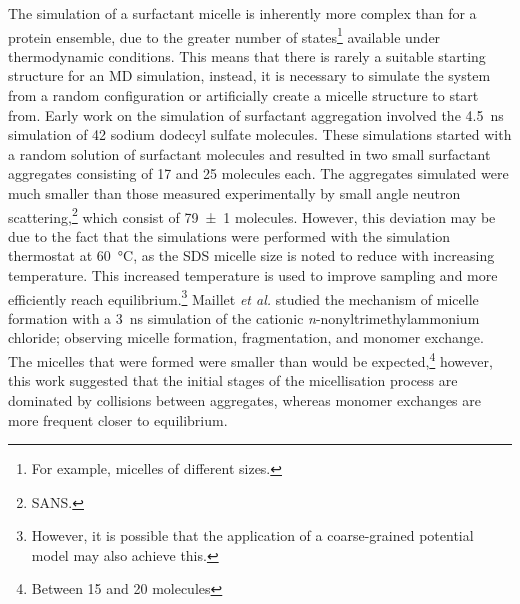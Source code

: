 The simulation of a surfactant micelle is inherently more complex than for a protein ensemble, due to the greater number of states\footnote{For example, micelles of different sizes.} available under thermodynamic conditions.
This means that there is rarely a suitable starting structure for an MD simulation, instead, it is necessary to simulate the system from a random configuration or artificially create a micelle structure to start from.
Early work on the simulation of surfactant aggregation involved the \SI{4.5}{\nano\second} simulation of 42 sodium dodecyl sulfate molecules.\autocite{tarek_molecular_1998}
These simulations started with a random solution of surfactant molecules and resulted in two small surfactant aggregates consisting of 17 and 25 molecules each.
The aggregates simulated were much smaller than those measured experimentally by small angle neutron scattering,\footnote{SANS.} which consist of \num{79\pm1} molecules.\autocite{hassan_small_2003}
However, this deviation may be due to the fact that the simulations were performed with the simulation thermostat at \SI{60}{\celsius}, as the SDS micelle size is noted to reduce with increasing temperature.\autocite{hayashi_micelle_1980}
This increased temperature is used to improve sampling and more efficiently reach equilibrium.\footnote{However, it is possible that the application of a coarse-grained potential model may also achieve this.}
Maillet \emph{et al.} studied the mechanism of micelle formation with a \SI{3}{\nano\second} simulation of the cationic \emph{n}-nonyltrimethylammonium chloride; observing micelle formation, fragmentation, and monomer exchange.\autocite{maillet_large_1999}
The micelles that were formed were smaller than would be expected,\footnote{Between \num{15} and \num{20} molecules} however, this work suggested that the initial stages of the micellisation process are dominated by collisions between aggregates, whereas monomer exchanges are more frequent closer to equilibrium.

